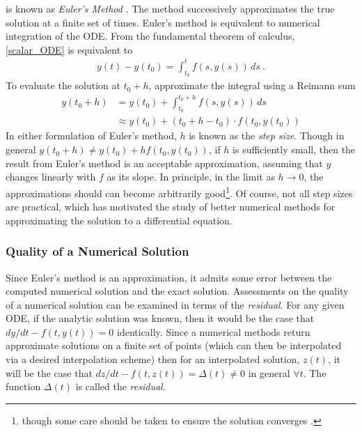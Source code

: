  is known as \textit{Euler's Method} \cite{boyce2012differential}.  The method successively approximates the true solution at a finite set of times. Euler's method is equivalent to numerical integration of the ODE.  From the fundamental theorem of calculus, \cref{scalar_ODE} is equivalent to
%
\begin{align*}
	y(t) - y(t_0) = \int_{t_0}^t f(s,y(s)) \, ds \>.
\end{align*}
%
To evaluate the solution at $ t_0+h $, approximate the integral using a Reimann sum
%
\begin{equation}
\begin{aligned}
	y(t_0+h) &= y(t_0) + \int_{t_0}^{t_0+h}f(s,y(s)) \, ds \\
				  &\approx y(t_0) + (t_0 + h - t_0)\cdot f(t_0, y(t_0))
\end{aligned}
\end{equation}
In either formulation of Euler's method, $ h $ is known as the \textit{step size}. Though in general $ y(t_0+h) \neq y(t_0) + hf(t_0,y(t_0)) $, if $ h $ is sufficiently small, then the result from Euler's method is an acceptable approximation, assuming that $ y $ changes linearly with $ f $ as its slope. In principle, in the limit as $ h \rightarrow 0 $, the approximations should can become arbitrarily good\footnote{though some care should be taken to ensure the solution converges \cite{corless2013graduate}.}.  Of course, not all step sizes are practical, which has motivated the study of better numerical methods for approximating the solution to a differential equation.

\subsubsection{Quality of a Numerical Solution}

Since Euler's method is an approximation, it admits some error between the computed numerical solution and the exact solution.  Assessments on the quality of a numerical solution can be examined in terms of the \textit{residual}.  For any given ODE, if the analytic solution was known, then it would be the case that $ dy/dt - f(t,y(t))= 0 $ identically.  Since a numerical methods return approximate solutions on a finite set of points (which can then be interpolated via a desired interpolation scheme) then for an interpolated solution, $ z(t) $, it will be the case that $ dz/dt - f(t,z(t)) = \Delta (t) \neq 0$ in general $ \forall t $.  The function $ \Delta (t) $ is called the \textit{residual}.

